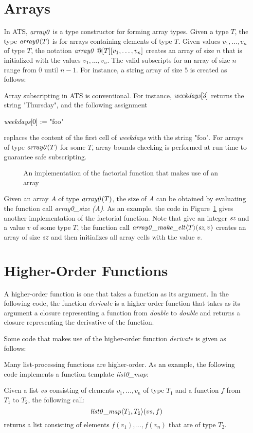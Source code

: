 \section{Arrays}
In ATS, ${\it array0}$ is a type constructor for forming array types.  Given
a type $T$, the type ${\it array0}(T)$ is for arrays containing elements of
type $T$.  Given values $v_1,\ldots,v_n$ of type $T$, the notation ${\it
array0}~@[T][v_1,\ldots,v_n]$ creates an array of size $n$ that is
initialized with the values $v_1,\ldots,v_n$.  The valid subscripts for an
array of size $n$ range from $0$ until $n-1$. For instance, a string array
of size $5$ is created as follows:

Array subscripting in ATS is conventional. For instance, ${\it
weekdays}[3]$ returns the string "Thursday", and the following assignment
\begin{center}
{\it weekdays}[0] := "foo"
\end{center}
replaces the content of the first cell of {\it weekdays} with the string
"foo". For arrays of type ${\it array0}(T)$ for some $T$, array bounds
checking is performed at run-time to guarantee safe subscripting.

\begin{figure}[thp]

\caption{An implementation of the factorial function that makes use of an array}
\label{figure:array0_example_2}
\end{figure}
Given an array $A$ of type ${\it array0}(T)$, the size of $A$ can be
obtained by evaluating the function call {\it array0\_size (A)}. As an
example, the code in Figure~\ref{figure:array0_example_2} gives another
implementation of the factorial function.  Note that give an integer
$\mbox{\it sz}$ and a value $v$ of some type $T$, the function call ${\it
array0\_make\_elt}\langle T\rangle (\mbox{\it sz}, v)$ creates an array of
size $\mbox{\it sz}$ and then initializes all array cells with the value
$v$.

\section{Higher-Order Functions}
A higher-order function is one that takes a function as its argument.  In
the following code, the function {\it derivate} is a higher-order function
that takes as its argument a closure representing a function from {\it
double} to {\it double} and returns a closure representing the derivative
of the function.

Some code that makes use of the higher-order function {\it derivate}
is given as follows:

Many list-processing functions are higher-order. As an example,
the following code implements a function template {\it list0\_map}:

Given a list $vs$ consisting of elements $v_1,\ldots,v_n$ of type $T_1$ and
a function $f$ from $T_1$ to $T_2$, the following call: $${\it
list0\_map}\langle T_1,T_2\rangle(vs, f)$$ returns a list consisting
of elements $f(v_1),\ldots, f(v_n)$ that are of type $T_2$.

